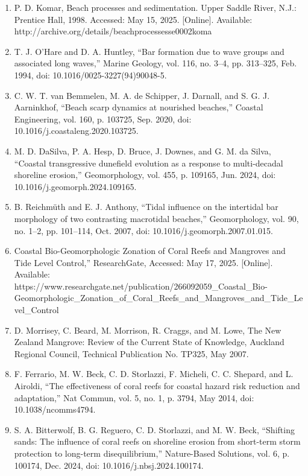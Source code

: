 \documentclass{article}
\begin{document}
\begin{enumerate}
    \item{P. D. Komar, Beach processes and sedimentation. Upper Saddle River, N.J.: Prentice Hall, 1998. Accessed: May 15, 2025. [Online]. Available: http://archive.org/details/beachprocessesse0002koma}


    \item{T. J. O’Hare and D. A. Huntley, “Bar formation due to wave groups and associated long waves,” Marine Geology, vol. 116, no. 3–4, pp. 313–325, Feb. 1994, doi: 10.1016/0025-3227(94)90048-5.}

    \item{C. W. T. van Bemmelen, M. A. de Schipper, J. Darnall, and S. G. J. Aarninkhof, “Beach scarp dynamics at nourished beaches,” Coastal Engineering, vol. 160, p. 103725, Sep. 2020, doi: 10.1016/j.coastaleng.2020.103725.}

    \item{M. D. DaSilva, P. A. Hesp, D. Bruce, J. Downes, and G. M. da Silva, “Coastal transgressive dunefield evolution as a response to multi-decadal shoreline erosion,” Geomorphology, vol. 455, p. 109165, Jun. 2024, doi: 10.1016/j.geomorph.2024.109165.}

    \item{B. Reichmüth and E. J. Anthony, “Tidal influence on the intertidal bar morphology of two contrasting macrotidal beaches,” Geomorphology, vol. 90, no. 1–2, pp. 101–114, Oct. 2007, doi: 10.1016/j.geomorph.2007.01.015.}

    \item{Coastal Bio-Geomorphologic Zonation of Coral Reefs and Mangroves and Tide Level Control,” ResearchGate, Accessed: May 17, 2025. [Online]. Available: https://www.researchgate.net/publication/266092059_Coastal_Bio-Geomorphologic_Zonation_of_Coral_Reefs_and_Mangroves_and_Tide_Level_Control}

    \item{D. Morrisey, C. Beard, M. Morrison, R. Craggs, and M. Lowe, The New Zealand Mangrove: Review of the Current State of Knowledge, Auckland Regional Council, Technical Publication No. TP325, May 2007.}

    \item{F. Ferrario, M. W. Beck, C. D. Storlazzi, F. Micheli, C. C. Shepard, and L. Airoldi, “The effectiveness of coral reefs for coastal hazard risk reduction and adaptation,” Nat Commun, vol. 5, no. 1, p. 3794, May 2014, doi: 10.1038/ncomms4794.}

    \item{S. A. Bitterwolf, B. G. Reguero, C. D. Storlazzi, and M. W. Beck, “Shifting sands: The influence of coral reefs on shoreline erosion from short-term storm protection to long-term disequilibrium,” Nature-Based Solutions, vol. 6, p. 100174, Dec. 2024, doi: 10.1016/j.nbsj.2024.100174.}


\end{enumerate}
\end{document}
